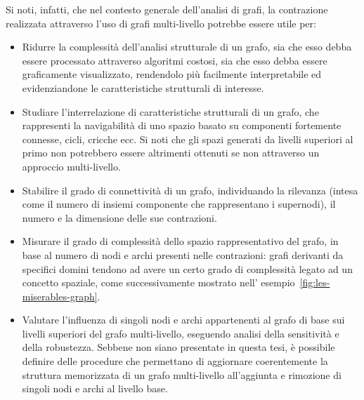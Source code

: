Si noti, infatti, che nel contesto generale dell'analisi di grafi, la contrazione realizzata attraverso
l'uso di grafi multi-livello potrebbe essere utile per:
\begin{itemize}
    \item Ridurre la complessit\`a dell'analisi strutturale di un grafo, sia che esso debba essere processato
    attraverso algoritmi costosi, sia che esso debba essere graficamente visualizzato, rendendolo pi\`u facilmente
    interpretabile ed evidenziandone le caratteristiche strutturali di interesse.
    \item Studiare l'interrelazione di caratteristiche strutturali di un grafo, che rappresenti la navigabilit\`a
    di uno spazio basato su componenti fortemente connesse, cicli, cricche ecc.
    Si noti che gli spazi generati da livelli superiori al primo non potrebbero essere altrimenti ottenuti se
    non attraverso un approccio multi-livello.
    \item Stabilire il grado di connettivit\`a di un grafo, individuando la rilevanza (intesa come il numero di
    insiemi componente che rappresentano i supernodi), il numero e la dimensione delle sue contrazioni.
    \item Misurare il grado di complessit\`a dello spazio rappresentativo del grafo, in base al numero
    di nodi e archi presenti nelle contrazioni: grafi derivanti da specifici domini tendono ad avere un certo
    grado di complessit\`a legato ad un concetto spaziale, come successivamente mostrato nell'
    esempio~\ref{fig:les-miserables-graph}.
    \item Valutare l'influenza di singoli nodi e archi appartenenti al grafo di base sui livelli superiori
    del grafo multi-livello, eseguendo analisi della sensitivit\`a e della robustezza.
    Sebbene non siano presentate in questa tesi, è possibile definire delle procedure che permettano di aggiornare
    coerentemente la struttura memorizzata di un grafo multi-livello all'aggiunta e rimozione di singoli nodi e
    archi al livello base.
\end{itemize}

